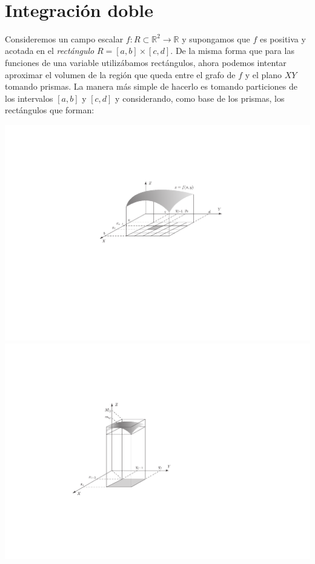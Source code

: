 \newpage
\thispagestyle{empty}

\ 

\vfill
\newpage


\section{Integración doble} %


Consideremos un campo escalar $f\colon R\subset\mathbb{R}^2\to \mathbb{R}$ y supongamos que $f$ es positiva
y acotada en el \emph{rectángulo} $R=[a,b]\times[c,d]$. De la misma forma que para las funciones de una variable utilizábamos rectángulos, ahora podemos intentar aproximar el volumen de la región que queda entre el grafo de $f$ y el plano $XY$ tomando prismas.
La manera más simple de hacerlo es tomando particiones de los intervalos $[a,b]$ y $[c,d]$ y considerando, como base de los prismas, los rectángulos que forman:
\begin{latexonly}
\begin{center}
\includegraphics[scale=.8]{T3/figs/IntDoble1.pdf}\\
\includegraphics[scale=.8]{T3/figs/IntDoble2.pdf}
\end{center}
\end{latexonly}
